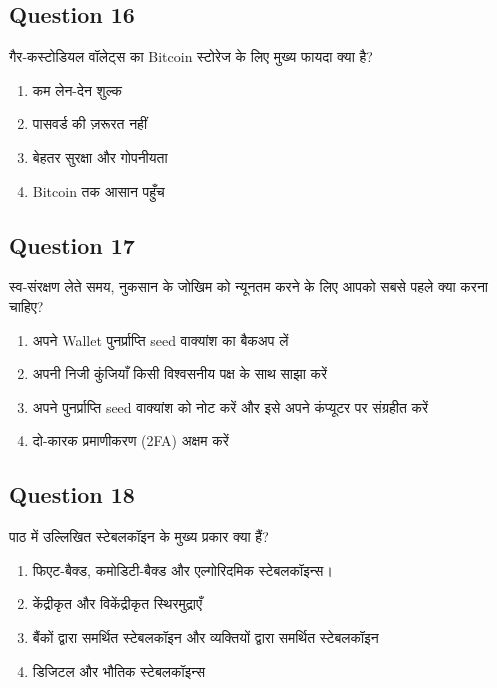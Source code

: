 \documentclass[12pt,a4paper]{article}
\begin{document}
\bigskip


\subsection*{Question 16}
गैर-कस्टोडियल वॉलेट्स का Bitcoin स्टोरेज के लिए मुख्य फायदा क्या है?

\begin{enumerate}[label=\Alph*., leftmargin=*]
\item कम लेन-देन शुल्क
\item पासवर्ड की ज़रूरत नहीं
\item बेहतर सुरक्षा और गोपनीयता
\item Bitcoin तक आसान पहुँच
\end{enumerate}

\bigskip


\subsection*{Question 17}
स्व-संरक्षण लेते समय, नुकसान के जोखिम को न्यूनतम करने के लिए आपको सबसे पहले क्या करना चाहिए?

\begin{enumerate}[label=\Alph*., leftmargin=*]
\item अपने Wallet पुनर्प्राप्ति seed वाक्यांश का बैकअप लें
\item अपनी निजी कुंजियाँ किसी विश्वसनीय पक्ष के साथ साझा करें
\item अपने पुनर्प्राप्ति seed वाक्यांश को नोट करें और इसे अपने कंप्यूटर पर संग्रहीत करें
\item दो-कारक प्रमाणीकरण (2FA) अक्षम करें
\end{enumerate}

\bigskip


\subsection*{Question 18}
पाठ में उल्लिखित स्टेबलकॉइन के मुख्य प्रकार क्या हैं?

\begin{enumerate}[label=\Alph*., leftmargin=*]
\item फिएट-बैक्ड, कमोडिटी-बैक्ड और एल्गोरिदमिक स्टेबलकॉइन्स।
\item केंद्रीकृत और विकेंद्रीकृत स्थिरमुद्राएँ
\item बैंकों द्वारा समर्थित स्टेबलकॉइन और व्यक्तियों द्वारा समर्थित स्टेबलकॉइन
\item डिजिटल और भौतिक स्टेबलकॉइन्स
\end{enumerate}
\end{document}
